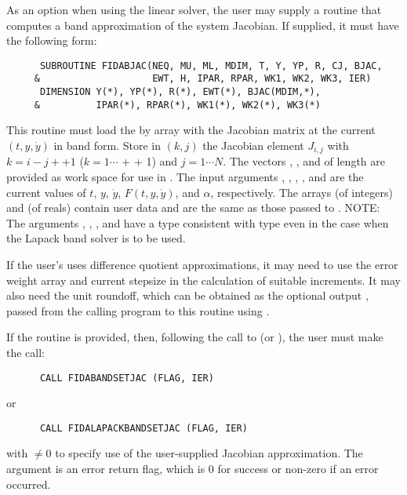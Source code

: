 \begin{Steps}
  As an option when using the {\band} linear solver, the user may supply a
  routine that computes a band approximation of the system Jacobian. If supplied,
  it must have the following form:
\begin{verbatim}
      SUBROUTINE FIDABJAC(NEQ, MU, ML, MDIM, T, Y, YP, R, CJ, BJAC,
     &                    EWT, H, IPAR, RPAR, WK1, WK2, WK3, IER)
      DIMENSION Y(*), YP(*), R(*), EWT(*), BJAC(MDIM,*), 
     &          IPAR(*), RPAR(*), WK1(*), WK2(*), WK3(*)
\end{verbatim}
  This routine must load the  by  array  with the
  Jacobian matrix at the current $(t, y, \dot{y})$ in band form.  Store in
  $(k,j)$ the Jacobian element $J_{i,j}$ with $k = i - j + $$ + 1$
  ($k = 1 \cdots $ +  + 1) and $j = 1 \cdots N$. The vectors
  , , and  of length  are provided as work space
  for use in .
  The input arguments , , , , and  are the
  current values of $t$, $y$, $\dot{y}$, $F(t,y,\dot{y})$, and $\alpha$, respectively.
  The arrays  (of integers) and  (of reals) contain user data
  and are the same as those passed to .
  NOTE: The arguments , , , and  have a type
  consistent with {\C} type  even in the case when the Lapack band
  solver is to be used.

  If the user's  uses difference quotient approximations, it
  may need to use the error weight array  and current stepsize 
  in the calculation of suitable increments.  It may also need the unit
  roundoff, which can be obtained as the optional output ,
  passed from the calling program to this routine using .

  If the  routine is provided, then, following the call to
   (or ), the user must make the call:
\begin{verbatim}
      CALL FIDABANDSETJAC (FLAG, IER)
\end{verbatim}
  or
\begin{verbatim}
      CALL FIDALAPACKBANDSETJAC (FLAG, IER)
\end{verbatim}
  with  $\neq 0$ to specify use of the user-supplied Jacobian
  approximation.  The argument  is an error return flag, which is $0$ 
  for success or non-zero if an error occurred.


\end{Steps}
